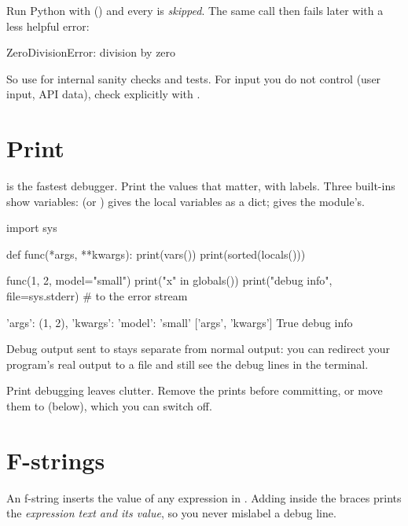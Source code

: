 \begin{trap}
Run Python with  () and every  is \emph{skipped}. The same call then fails
later with a less helpful error:
\begin{rawcode}
ZeroDivisionError: division by zero
\end{rawcode}
So use  for internal sanity checks and tests. For input you do not control (user input, API data), check explicitly with
.
\end{trap}

\section{Print}

 is the fastest debugger. Print the values that matter, with labels. Three built-ins show variables:
 (or ) gives the local variables as a dict;  gives the module's.

\begin{pycode}
import sys

def func(*args, **kwargs):
    print(vars())
    print(sorted(locals()))

func(1, 2, model="small")
print("x" in globals())
print("debug info", file=sys.stderr)       # to the error stream
\end{pycode}
\begin{rawcode}
{'args': (1, 2), 'kwargs': {'model': 'small'}}
['args', 'kwargs']
True
debug info
\end{rawcode}

Debug output sent to  stays separate from normal output: you can redirect your program's real output to a file and
still see the debug lines in the terminal.

\begin{trap}
Print debugging leaves clutter. Remove the prints before committing, or move them to  (below), which you can switch off.
\end{trap}

\section{F-strings}

An f-string inserts the value of any expression in \code{\{\}}. Adding \code{=} inside the braces prints the \emph{expression text and
its value}, so you never mislabel a debug line.

